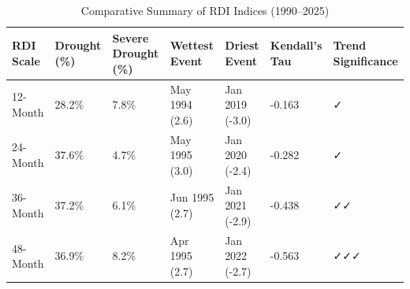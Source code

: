 \begin{table}

\caption{Comparative Summary of RDI Indices (1990–2025)}
\centering
\begin{tabular}[t]{l|l|l|l|l|l|l}
\hline
RDI Scale & Drought (\%) & Severe Drought (\%) & Wettest Event & Driest Event & Kendall’s Tau & Trend Significance\\
\hline
12-Month & 28.2\% & 7.8\% & May 1994 (2.6) & Jan 2019 (-3.0) & -0.163 & ✓\\
\hline
24-Month & 37.6\% & 4.7\% & May 1995 (3.0) & Jan 2020 (-2.4) & -0.282 & ✓\\
\hline
36-Month & 37.2\% & 6.1\% & Jun 1995 (2.7) & Jan 2021 (-2.9) & -0.438 & ✓✓\\
\hline
48-Month & 36.9\% & 8.2\% & Apr 1995 (2.7) & Jan 2022 (-2.7) & -0.563 & ✓✓✓\\
\hline
\end{tabular}
\end{table}
